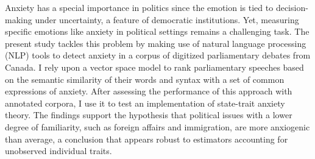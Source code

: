 Anxiety has a special importance in politics since the emotion is tied to decision-making under uncertainty, a feature of democratic institutions.  Yet, measuring specific emotions like anxiety in political settings remains a challenging task.  The present study tackles this problem by making use of natural language processing (NLP) tools to detect anxiety in a corpus of digitized parliamentary debates from Canada.  I rely upon a vector space model to rank parliamentary speeches based on the semantic similarity of their words and syntax with a set of common expressions of anxiety.  After assessing the performance of this approach with annotated corpora, I use it to test an implementation of state-trait anxiety theory.  The findings support the hypothesis that political issues with a lower degree of familiarity, such as foreign affairs and immigration, are more anxiogenic than average, a conclusion that appears robust to estimators accounting for unobserved individual traits.
